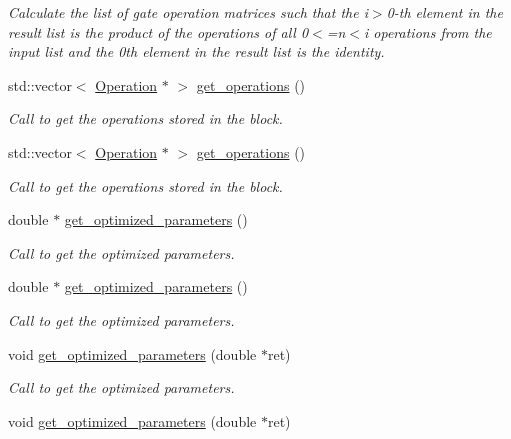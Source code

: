 \begin{DoxyCompactItemize}
\begin{DoxyCompactList}\small\item\em Calculate the list of gate operation matrices such that the i$>$0-\/th element in the result list is the product of the operations of all 0$<$=n$<$i operations from the input list and the 0th element in the result list is the identity. \end{DoxyCompactList}\item 
std\+::vector$<$ \hyperlink{class_operation}{Operation} $\ast$ $>$ \hyperlink{class_operation__block_aecb9b674dfd43456605a6c13dfba3afb}{get\+\_\+operations} ()
\begin{DoxyCompactList}\small\item\em Call to get the operations stored in the block. \end{DoxyCompactList}\item 
std\+::vector$<$ \hyperlink{class_operation}{Operation} $\ast$ $>$ \hyperlink{class_operation__block_a489d0c5758732ca49d5f5aca225e9318}{get\+\_\+operations} ()
\begin{DoxyCompactList}\small\item\em Call to get the operations stored in the block. \end{DoxyCompactList}\item 
double $\ast$ \hyperlink{class_decomposition___base_ae2dd23fc79127ca9d25eafeb1137d094}{get\+\_\+optimized\+\_\+parameters} ()
\begin{DoxyCompactList}\small\item\em Call to get the optimized parameters. \end{DoxyCompactList}\item 
double $\ast$ \hyperlink{class_decomposition___base_a27c8d07322621ccd644aaff8af667809}{get\+\_\+optimized\+\_\+parameters} ()
\begin{DoxyCompactList}\small\item\em Call to get the optimized parameters. \end{DoxyCompactList}\item 
void \hyperlink{class_decomposition___base_ae9d74e7137a05ceda5d6efeba8cc6c8e}{get\+\_\+optimized\+\_\+parameters} (double $\ast$ret)
\begin{DoxyCompactList}\small\item\em Call to get the optimized parameters. \end{DoxyCompactList}\item 
void \hyperlink{class_decomposition___base_ae9d74e7137a05ceda5d6efeba8cc6c8e}{get\+\_\+optimized\+\_\+parameters} (double $\ast$ret)

\end{DoxyCompactItemize}
